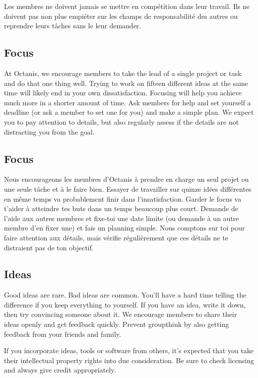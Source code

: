 	Les membres ne doivent jamais se mettre en compétition dans leur travail. Ils ne doivent pas non plus empiéter sur les champs de responsabilité des autres ou reprendre leurs tâches sans le leur demander.


	
\english
	\subsection{Focus}
	At Octanis, we encourage members to take the lead of a single project or task and do that one thing well. Trying to work on fifteen different ideas at the same time will likely end in your own dissatisfaction. Focusing will help you achieve much more in a shorter amount of time. Ask members for help and set yourself a deadline (or ask a member to set one for you) and make a simple plan.
	We expect you to pay attention to details, but also regularly assess if the details are not distracting you from the goal.

	\vspace{0.5cm}


\french
	\subsection{Focus}
	Nous encourageons les membres d'Octanis à prendre en charge un seul projet ou une seule tâche et à le faire bien. Essayer de travailler sur quinze idées différentes en même temps va probablement finir dans l'insatisfaction. Garder le focus va t'aider à atteindre tes buts dans un temps beaucoup plus court. Demande de l'aide aux autres membres et fixe-toi une date limite (ou demande à un autre membre d'en fixer une) et fais un planning simple. 
	Nous comptons sur toi pour faire attention aux détails, mais vérifie régulièrement que ces détails ne te distraient pas de ton objectif. 
	

\english
	\subsection{Ideas}
	Good ideas are rare. Bad ideas are common. You'll have a hard time telling the difference if you keep everything to yourself.
	If you have an idea, write it down, then try convincing someone about it. We encourage members to share their ideas openly and get feedback quickly. Prevent groupthink by also getting feedback from your friends and family.

	If you incorporate ideas, tools or software from others, it's expected that you take their intellectual property rights into due consideration. Be sure to check licensing and always give credit appropriately.

